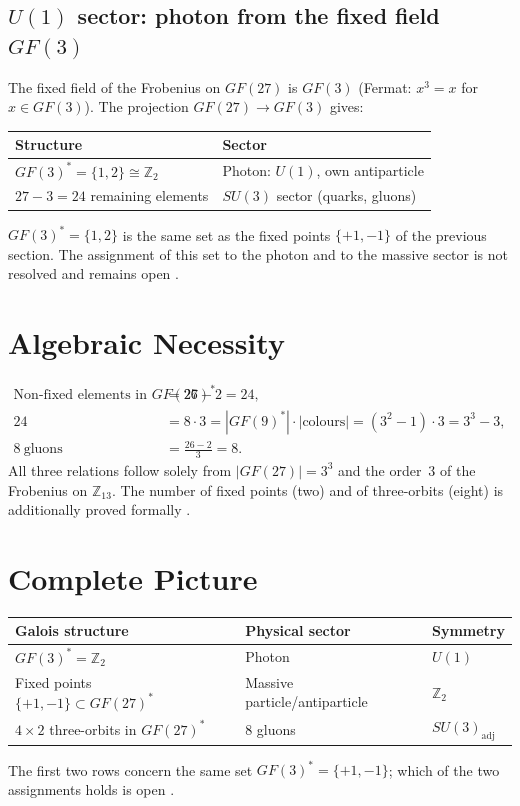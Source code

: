 \subsection{$U(1)$ sector: photon from the fixed field $GF(3)$}

The fixed field of the Frobenius on $GF(27)$ is $GF(3)$ (Fermat: $x^3=x$ for
$x\in GF(3)$). The projection $GF(27)\to GF(3)$ gives:

\begin{center}
\begin{tabular}{ll}
\toprule
Structure & Sector \\
\midrule
$GF(3)^*=\{1,2\}\cong\mathbb{Z}_2$ & Photon: $U(1)$, own antiparticle \\
$27-3=24$ remaining elements & $SU(3)$ sector (quarks, gluons) \\
\bottomrule
\end{tabular}
\end{center}
$GF(3)^*=\{1,2\}$ is the same set as the fixed points $\{+1,-1\}$ of the
previous section. The assignment of this set to the photon and to the massive
sector is not resolved and remains open \SM.

\section{Algebraic Necessity \BM}

\begin{align}
\text{Non-fixed elements in }GF(27)^* &= 26-2=24,\\
24 &= 8\cdot3=|GF(9)^*|\cdot|\text{colours}|
     =(3^2-1)\cdot3=3^3-3,\\
8\ \text{gluons} &= \tfrac{26-2}{3}=8.
\end{align}
All three relations follow solely from $|GF(27)|=3^3$ and the order~3 of the
Frobenius on $\mathbb{Z}_{13}$. The number of fixed points (two) and of
three-orbits (eight) is additionally proved formally \LM.

\section{Complete Picture}

\begin{center}
\begin{tabular}{lll}
\toprule
Galois structure & Physical sector & Symmetry \\
\midrule
$GF(3)^*=\mathbb{Z}_2$ & Photon & $U(1)$ \\
Fixed points $\{+1,-1\}\subset GF(27)^*$ & Massive particle/antiparticle & $\mathbb{Z}_2$ \\
$4\times2$ three-orbits in $GF(27)^*$ & 8 gluons & $SU(3)_\mathrm{adj}$ \\
\bottomrule
\end{tabular}
\end{center}
The first two rows concern the same set $GF(3)^*=\{+1,-1\}$; which of the two
assignments holds is open \SM.


